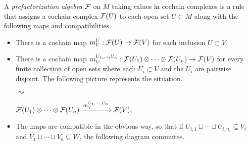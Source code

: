 \documentclass[11pt]{amsart}
\begin{document}
A {\em prefactorization algebra} $\mathcal F$ on $M$ taking values in cochain complexes is a rule that assigns a cochain complex $\mathcal F(U)$ to each open set $U \subset M$ along with the following maps and compatibilities.
\begin{itemize}
\item  There is a cochain map $m_V^U: \mathcal F(U) \rightarrow \mathcal F(V)$ for each inclusion $U \subset V$.

\item There is a cochain map $m_V^{U_1,\ldots,U_n} : \mathcal F(U_1) \otimes \cdots \otimes \mathcal F(U_n) \rightarrow \mathcal F(V)$ for every finite collection of open sets where each $U_i \subset V$ and the $U_i$ are pairwise disjoint. The following picture represents the situation.
\begin{center}
 \begin{minipage}[c]{3cm}
 \end{minipage}
\hspace{0.7cm} $\rightsquigarrow$ \hspace{0.5cm}
 \begin{minipage}[c]{8cm}
$\mathcal F(U_1)\otimes\dots\otimes\mathcal F(U_n)\xrightarrow{m_V^{U_1,\ldots,U_n}}\mathcal F(V),$
 \end{minipage}
\end{center}

\item The maps are compatible in the obvious way, so that if $U_{i,1}\sqcup\cdots\sqcup U_{i,n_i}\subseteq V_i$ and $V_1\sqcup\cdots\sqcup V_k\subseteq W$, the following diagram commutes.
\begin{center}
\end{center}
\end{itemize}
\end{document}
